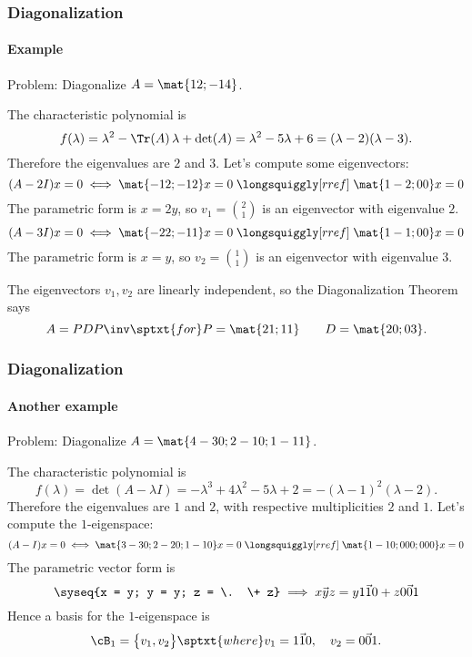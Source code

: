 \begin{frame}
\frametitle{Diagonalization}
\framesubtitle{Example}

\alert{Problem:} Diagonalize $A = \mat{1 2; -1 4}$.

\medskip
\begin{webonly}%
The characteristic polynomial is
\[ f(\lambda) = \lambda^2 - \Tr(A)\,\lambda + \det(A)
= \lambda^2 - 5\lambda + 6 = (\lambda-2)(\lambda-3). \]
Therefore the eigenvalues are
$2$ and $3$.  Let's compute some eigenvectors:
\[ (A-2I)x = 0 \iff
  \mat{-1 2; -1 2}x = 0
  \;\longsquiggly[rref]\;
  \mat{1 -2; 0 0}x = 0
  \]
The parametric form is $x = 2y$, so $v_1 = {2\choose 1}$ is an eigenvector with
eigenvalue $2$.
\[ (A-3I)x = 0 \iff
  \mat{-2 2; -1 1}x = 0
  \;\longsquiggly[rref]\;
  \mat{1 -1; 0 0}x = 0
\]
The parametric form is $x = y$, so $v_2 = {1\choose 1}$ is an eigenvector with
eigenvalue $3$.

\medskip
The eigenvectors $v_1,v_2$ are linearly independent, so the Diagonalization
Theorem says
\[ A = PDP\inv \sptxt{for} P = \mat{2 1; 1 1} \qquad D = \mat{2 0; 0 3}. \]
\end{webonly}

\end{frame}



\begin{frame}
\frametitle{Diagonalization}
\framesubtitle{Another example}

\alert{Problem:} Diagonalize $A = \mat{4 -3 0; 2 -1 0; 1 -1 1}$.

\medskip
\begin{webonly}%
\displayskips{3pt}
The characteristic polynomial is
\[ f(\lambda) = \det(A-\lambda I) = -\lambda^3+4\lambda^2-5\lambda+2
= -(\lambda-1)^2(\lambda-2). \]
Therefore the eigenvalues are $1$ and $2$, with respective multiplicities $2$
and $1$.  Let's compute the $1$-eigenspace:
\[ (A-I)x = 0 \iff
\mat{3 -3 0; 2 -2 0; 1 -1 0}x = 0
\;\longsquiggly[rref]\;
\mat{1 -1 0; 0 0 0; 0 0 0}x = 0
\]
The parametric vector form is
\[ \syseq{x = y; y = y; z = \. \+ z}
\implies \vec{x y z} = y\vec{1 1 0} + z\vec{0 0 1}  \]
Hence a basis for the $1$-eigenspace is
\[ \cB_1 = \bigl\{ v_1,v_2 \bigr\} \sptxt{where}
v_1 = \vec{1 1 0}, \quad v_2 = \vec{0 0 1}. \]

\end{webonly}

\end{frame}


